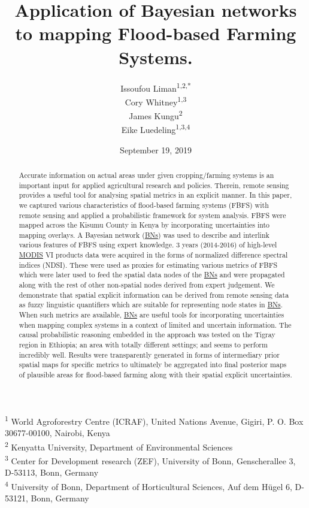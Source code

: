 \documentclass[12pt,oneside]{article}
\title{Application of Bayesian networks to mapping Flood-based Farming Systems.}
\author{Issoufou Liman\textsuperscript{1,2,*} \\ Cory Whitney\textsuperscript{1,3} \\ James Kungu\textsuperscript{2} \\ Eike Luedeling\textsuperscript{1,3,4}}
\date{September 19, 2019}
\begin{document}
\maketitle
\begin{abstract}
Accurate information on actual areas under given cropping/farming systems is an important input for applied agricultural research and policies. Therein, remote sensing provides a useful tool for analysing spatial metrics in an explicit manner. In this paper, we captured various characteristics of flood-based farming systems (FBFS) with remote sensing and applied a probabilistic framework for system analysis. FBFS were mapped across the Kisumu County in Kenya by incorporating uncertainties into mapping overlays. A Bayesian network (\href{https://en.wikipedia.org/wiki/Bayesian_network}{BNs}) was used to describe and interlink various features of FBFS using expert knowledge. 3 years (2014-2016) of high-level \href{https://terra.nasa.gov/about/terra-instruments/modis}{MODIS} VI products data were acquired in the forms of normalized difference spectral indices (NDSI). These were used as proxies for estimating various metrics of FBFS which were later used to feed the spatial data nodes of the \href{https://en.wikipedia.org/wiki/Bayesian_network}{BNs} and were propagated along with the rest of other non-spatial nodes derived from expert judgement. We demonstrate that spatial explicit information can be derived from remote sensing data as fuzzy linguistic quantifiers which are suitable for representing node states in \href{https://en.wikipedia.org/wiki/Bayesian_network}{BNs}. When such metrics are available, \href{https://en.wikipedia.org/wiki/Bayesian_network}{BNs} are useful tools for incorporating uncertainties when mapping complex systems in a context of limited and uncertain information. The causal probabilistic reasoning embedded in the approach was tested on the Tigray region in Ethiopia; an area with totally different settings; and seems to perform incredibly well. Results were transparently generated in forms of intermediary prior spatial maps for specific metrics to ultimately be aggregated into final posterior maps of plausible areas for flood-based farming along with their spatial explicit uncertainties.
\end{abstract}

{
\hypersetup{linkcolor=black}
\setcounter{tocdepth}{5}
\tableofcontents
}
\textsuperscript{1} World Agroforestry Centre (ICRAF), United Nations Avenue, Gigiri, P. O. Box 30677-00100, Nairobi, Kenya\\
\textsuperscript{2} Kenyatta University, Department of Environmental Sciences\\
\textsuperscript{3} Center for Development research (ZEF), University of Bonn, Genscherallee 3, D-53113, Bonn, Germany\\
\textsuperscript{4} University of Bonn, Department of Horticultural Sciences, Auf dem Hügel 6, D-53121, Bonn, Germany
\end{document}
